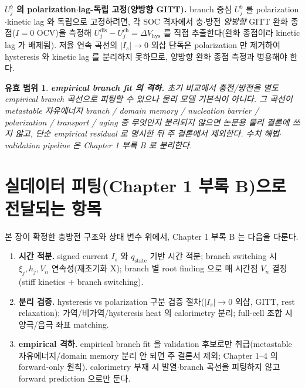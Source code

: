 \documentclass[11pt,a4paper]{article}
\newtheorem*{boundbox}{유효 범위}
\newcommand{\dis}{\mathrm{dis}}
\newcommand{\chg}{\mathrm{ch}}
\newcommand{\hys}{\mathrm{hys}}
\newcommand{\stt}{\mathrm{state}}
\begin{document}
\textbf{$U_j^b$ 의 polarization$\cdot$lag-독립 고정(양방향 GITT).} branch 중심 $U_j^b$ 를 polarization$\cdot$kinetic
lag 와 독립으로 고정하려면, 각 SOC 격자에서 충$\cdot$방전 \emph{양방향} GITT 완화 종점($I=0$ OCV)을 측정해
$U_j^\dis-U_j^\chg=\Delta V_\hys$ 를 직접 추출한다(완화 종점이라 kinetic lag 가 배제됨). 저율 연속 곡선의
$|I_s|\to0$ 외삽 단독은 polarization 만 제거하여 hysteresis 와 kinetic lag 를 분리하지 못하므로, 양방향 완화 종점
측정과 병용해야 한다.

\begin{boundbox}
\textbf{empirical branch fit 의 격하.} 초기 비교에서 충전/방전을 별도 empirical branch 곡선으로 피팅할 수 있으나
물리 모델 기본식이 아니다. 그 곡선이 metastable 자유에너지 branch / domain memory / nucleation barrier /
polarization / transport / aging 중 무엇인지 분리되지 않으면 논문용 물리 결론에 쓰지 않고, 단순 empirical
residual 로 명시한 뒤 주 결론에서 제외한다. 수치 해법$\cdot$validation pipeline 은 Chapter 1 부록 B 로 분리한다.
\end{boundbox}

\section{실데이터 피팅(Chapter 1 부록 B)으로 전달되는 항목}\label{sec:ch5_transmit}
본 장이 확정한 충방전 구조와 상태 변수 위에서, Chapter 1 부록 B 는 다음을 다룬다.
\begin{enumerate}[label=\arabic*),leftmargin=2.0em,itemsep=2pt]
\item \textbf{시간 적분.} signed current $I_s$ 와 $q_\stt$ 기반 시간 적분; branch switching 시 $\xi_j,h_j,V_n$
  연속성(재초기화 X); branch 별 root finding 으로 매 시간점 $V_n$ 결정(stiff kinetics $+$ branch switching).
\item \textbf{분리 검증.} hysteresis vs polarization 구분 검증 절차($|I_s|\to0$ 외삽, GITT, rest relaxation);
  가역/비가역/hysteresis heat 의 calorimetry 분리; full-cell 조합 시 양극/음극 좌표 matching.
\item \textbf{empirical 격하.} empirical branch fit 을 validation 후보로만 취급(metastable 자유에너지/domain
  memory 분리 안 되면 주 결론서 제외; Chapter 1--4 의 forward-only 원칙). calorimetry 부재 시 발열$\cdot$branch
  곡선을 피팅하지 않고 forward prediction 으로만 둔다.
\end{enumerate}

\end{document}
